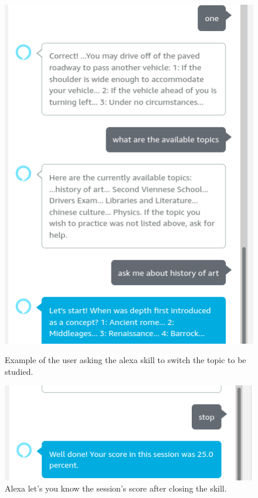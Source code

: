 \begin{figure}[!tbp]
  \centering
  \begin{minipage}[b]{0.4\textwidth}
    \includegraphics[width=\textwidth]{images/app/studying_assistant/change_topic.png}
    \caption{
        Example of the user asking the alexa skill to switch the topic to be studied.
    }
    \label{fig:change_topic}
  \end{minipage}
  \hfill
    \begin{minipage}[b]{0.4\textwidth}
    \includegraphics[width=\textwidth]{images/app/studying_assistant/stop.png}
    \caption{
        Alexa let's you know the session's score after closing the skill.
    }
    \label{fig:stop}
  \end{minipage}
\end{figure}



